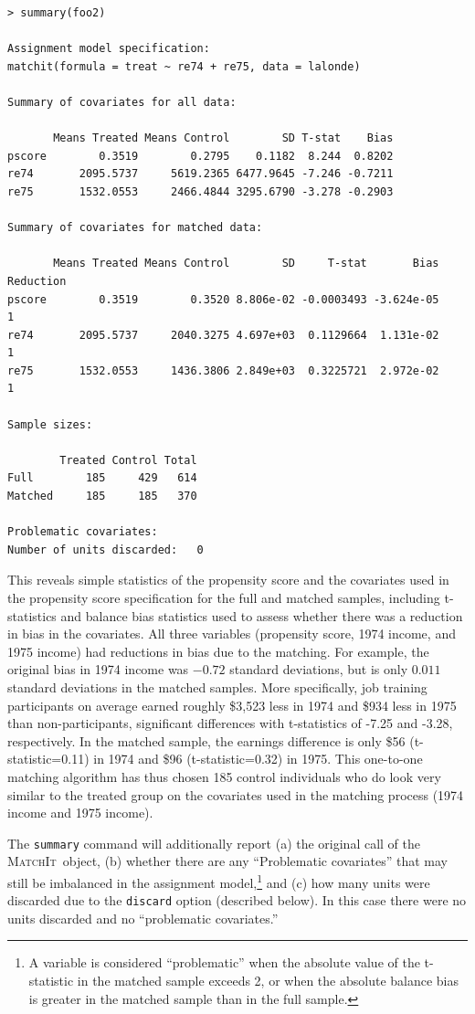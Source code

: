 \documentclass[oneside,letterpaper,titlepage]{article}
\newcommand{\MatchIt}{\textsc{MatchIt}}
\begin{document}
\begin{verbatim}
> summary(foo2)
 
Assignment model specification:
matchit(formula = treat ~ re74 + re75, data = lalonde)
 
Summary of covariates for all data:
 
       Means Treated Means Control        SD T-stat    Bias
pscore        0.3519        0.2795    0.1182  8.244  0.8202
re74       2095.5737     5619.2365 6477.9645 -7.246 -0.7211
re75       1532.0553     2466.4844 3295.6790 -3.278 -0.2903
 
Summary of covariates for matched data:
 
       Means Treated Means Control        SD     T-stat       Bias Reduction
pscore        0.3519        0.3520 8.806e-02 -0.0003493 -3.624e-05         1
re74       2095.5737     2040.3275 4.697e+03  0.1129664  1.131e-02         1
re75       1532.0553     1436.3806 2.849e+03  0.3225721  2.972e-02         1
 
Sample sizes:
 
        Treated Control Total
Full        185     429   614
Matched     185     185   370
 
Problematic covariates:
Number of units discarded:   0
\end{verbatim}

This reveals simple statistics of the propensity score and the
covariates used in the propensity score specification for the full and
matched samples, including t-statistics and balance bias statistics
used to assess whether there was a reduction in bias in the
covariates.  All three variables (propensity score, 1974 income, and
1975 income) had reductions in bias due to the matching.  For example,
the original bias in 1974 income was $-0.72$ standard deviations, but
is only $0.011$ standard deviations in the matched samples.  More
specifically, job training participants on average earned roughly
\$3,523 less in 1974 and \$934 less in 1975 than non-participants,
significant differences with t-statistics of -7.25 and -3.28,
respectively.  In the matched sample, the earnings difference is only
\$56 (t-statistic=0.11) in 1974 and \$96 (t-statistic=0.32) in 1975.
This one-to-one matching algorithm has thus chosen 185 control
individuals who do look very similar to the treated group on the
covariates used in the matching process (1974 income and 1975 income).

The \texttt{summary} command will additionally report (a) the original
call of the \MatchIt\ object, (b) whether there are any ``Problematic
covariates'' that may still be imbalanced in the assignment
model,\footnote{A variable is considered ``problematic'' when the
  absolute value of the t-statistic in the matched sample exceeds 2,
  or when the absolute balance bias is greater in the matched sample
  than in the full sample.} and (c) how many units were discarded due
to the \texttt{discard} option (described below).  In this case there
were no units discarded and no ``problematic covariates.''
\end{document}
